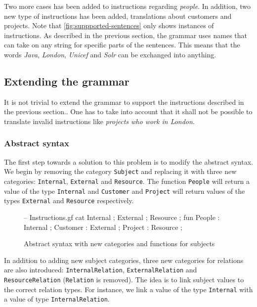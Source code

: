 Two more cases has been added to instructions regarding \emph{people}. In addition, two new type of instructions has been added, translations about customers and projects. Note that \autoref{fig:suppported-sentences} only shows instances of instructions. As described in the previous section, the grammar uses names that can take on any string for specific parts of the sentences. This means that the words \emph{Java}, \emph{London}, \emph{Unicef} and \emph{Solr} can be exchanged into anything.

\subsection{Extending the grammar}
It is not trivial to extend the grammar to support the instructions described in the previous section.. One has to take into account that it shall not be possible to translate invalid instructions like \emph{projects who work in London}.

\subsubsection{Abstract syntax}

The first step towards a solution to this problem is to modify the abstract syntax. We begin by removing the category \texttt{Subject} and replacing it with three new categories: \texttt{Internal}, \texttt{External} and \texttt{Resource}. The function \texttt{People} will return a value of the type \texttt{Internal} and \texttt{Customer} and \texttt{Project} will return values of the types \texttt{External} and \texttt{Resource} respectively.

\begin{figure}[H]
\begin{code}
-- Instructions.gf
cat
  Internal ;
  External ;
  Resource ;
fun
  People   : Internal ;
  Customer : External ;
  Project  : Resource ;
\end{code}
\caption{Abstract syntax with new categories and functions for subjects}
\end{figure}

In addition to adding new subject categories, three new categories for relations are also introduced: \texttt{InternalRelation}, \texttt{ExternalRelation} and \texttt{ResourceRelation} (\texttt{Relation} is removed). The idea is to link subject values to the correct relation types. For instance, we link a value of the type \texttt{Internal} with a value of type \texttt{InternalRelation}.

